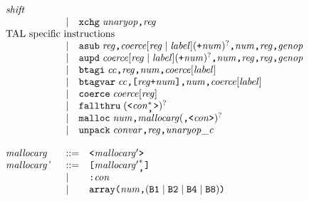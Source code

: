 \documentclass{article}
\newenvironment{gramrule}
  {\begin{flushleft}$\begin{array}{p{0.7in}ll}}
  {\end{array}$\end{flushleft}}
\newcommand{\nterm}[1]{{\it#1}}
\newcommand{\term}[1]{{\it#1}}
\newcommand{\ts}[1]{\hbox{\tt#1}}
\newcommand{\alt}{\mathrel{|}}
\begin{document}
\begin{gramrule}
    \nterm{shift} \\
&|& \ts{xchg} \; \nterm{unaryop} \ts{,} \nterm{reg} \\
\multicolumn{3}{l}{\hbox{TAL specific instructions}} \\
&|& \ts{asub} \; \nterm{reg} \ts{,}
    \nterm{coerce}[\nterm{reg}\alt\nterm{label}] (\ts{+} \term{num})^? \ts{,}
    \term{num} \ts{,} \nterm{reg} \ts{,} \nterm{genop} \\
&|& \ts{aupd} \; \nterm{coerce}[\nterm{reg}\alt\nterm{label}]
    (\ts{+} \term{num})^? \ts{,}
    \term{num} \ts{,} \nterm{reg} \ts{,} \nterm{reg} \ts{,} \nterm{genop} \\
&|& \ts{btagi} \; \term{cc} \ts{,} \nterm{reg} \ts{,} \term{num} \ts{,}
    \nterm{coerce}[\nterm{label}] \\
&|& \ts{btagvar} \; \term{cc} \ts{,} \ts{[} \nterm{reg} \ts{+}
    \term{num} \ts{]} \ts{,} \term{num} \ts{,} \nterm{coerce}[\nterm{label}] \\
&|& \ts{coerce} \; \nterm{coerce}[\nterm{reg}] \\
&|& \ts{fallthru} \; (\ts{<} \nterm{con}^*_{\ts{,}} \ts{>})^? \\
&|& \ts{malloc} \; \term{num} \ts{,} \nterm{mallocarg} (\ts{,}\ts{<}
    \nterm{con} \ts{>})^? \\
&|& \ts{unpack} \; \nterm{convar} \ts{,} \nterm{reg} \ts{,}
    \nterm{unaryop\_c} 
\end{gramrule}
\begin{gramrule}
\nterm{mallocarg} &::=& \ts{<} \nterm{mallocarg'} \ts{>} \\
\nterm{mallocarg'} &::=& \ts{[} \nterm{mallocarg'}_{\ts{,}}^* \ts{]} \\
&|& \ts{:} \nterm{con} \\
&|& \ts{array} \ts{(} \term{num} \ts{,} (\ts{B1} \alt \ts{B2} \alt
    \ts{B4} \alt \ts{B8}) \ts {)}
\end{gramrule}
\end{document}
